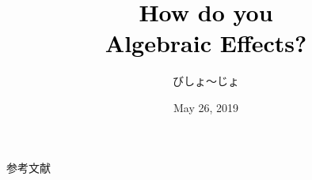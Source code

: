 \documentclass[unicode,compress,14pt,CJK%
\directlua{
    handout = os.getenv"HANDOUT"
    local _ = handout and tex.print(",handout")
}]{beamer}
\title{\textcolor{black}{\Huge \textbf{How do you} \textbfslant{implement}\\\textbf{Algebraic Effects?}}}
\author{びしょ〜じょ}
\date{May 26, 2019}
\institute{effect system勉強会}
\begin{document}
\maketitle












\switchfooter
\begin{frame}[t]{参考文献}
    \printbibliography
\end{frame}
\end{document}
